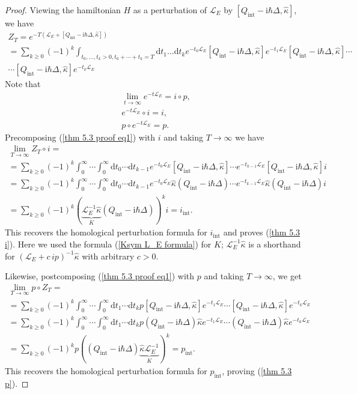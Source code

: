 \documentclass{amsart}
\theoremstyle{plain} %
\theoremstyle{definition}
\theoremstyle{remark}
\newcommand{\mc}{\mathcal}
\newcommand{\ra}{\rightarrow}
\newcommand{\wh}{\widehat}
\newcommand{\LL}{\mathcal{L}}
\newcommand{\ii}{\mathrm{int}}
\newcommand{\iii}{\mathrm{i}}
\newcommand{\dr}{\mathrm{d}}
\begin{document}
\begin{proof}
Viewing the hamiltonian $H$ as a perturbation of $\mc{L}_E$ by $[Q_\ii-\iii\hbar\Delta,\wh\kappa]$, 
we have
\begin{multline}\label{thm 5.3 proof eq1}
Z_T=e^{-T (\mc{L}_E+[Q_\ii-\iii\hbar\Delta,\wh\kappa])}
\\
=\sum_{k\geq 0}(-1)^k\int_{t_0,\ldots,t_k>0, t_0+\cdots+t_k=T}\dr t_1\ldots \dr t_k
e^{-t_0 \LL_E} [Q_\ii-\iii\hbar\Delta,\wh\kappa] e^{-t_1 \LL_E} [Q_\ii-\iii\hbar\Delta,\wh\kappa] \cdots \\
\cdots [Q_\ii-\iii\hbar\Delta,\wh\kappa] e^{-t_k \LL_E}
\end{multline}
Note that
\begin{eqnarray}
    \lim_{t\ra \infty} e^{-t \LL_E}= i\circ p, \label{thm 5.3 proof eq2}\\
    e^{-t \LL_E} \circ i = i, \label{thm 5.3 proof eq3}\\
    p\circ e^{-t \LL_E} = p. \label{thm 5.3 proof eq4}
\end{eqnarray}
Precomposing (\ref{thm 5.3 proof eq1}) with $i$ and taking $T\ra\infty$ we have
\begin{multline}
    \lim_{T\ra \infty}Z_T \circ i=\\=
    \sum_{k\geq 0}(-1)^k \int_0^\infty\cdots \int_0^\infty \dr t_0\cdots \dr t_{k-1}
    e^{-t_0 \LL_E} [Q_\ii-\iii\hbar\Delta,\wh\kappa] \cdots e^{-t_{k-1}\LL_E} [Q_\ii-\iii\hbar\Delta,\wh\kappa] i\\
    =\sum_{k\geq 0}(-1)^k \int_0^\infty\cdots \int_0^\infty \dr t_0\cdots \dr t_{k-1}
    e^{-t_0 \LL_E} \wh\kappa(Q_\ii-\iii\hbar\Delta) \cdots e^{-t_{k-1}\LL_E} \wh\kappa(Q_\ii-\iii\hbar\Delta) i\\
    =\sum_{k\geq 0} (-1)^k(\underbrace{\LL_E^{-1}\wh\kappa}_K (Q_\ii-\iii\hbar\Delta))^k i =
    i_\ii.
\end{multline}
This recovers the homological perturbation formula for $i_\ii$ and proves (\ref{thm 5.3 i}). Here we used the formula (\ref{Ksym L_E formula}) for $K$; $\LL_E^{-1}\wh\kappa$ is a shorthand for $(\LL_E+c\, ip)^{-1}\wh\kappa$ with arbitrary $c>0$.

Likewise, postcomposing (\ref{thm 5.3 proof eq1}) with $p$ and taking $T\ra\infty$, we get
\begin{multline}
    \lim_{T\ra\infty} p\circ Z_T =\\
    =\sum_{k\geq 0}(-1)^k \int_0^\infty \cdots \int_0^\infty \dr t_1\cdots \dr t_k
    p[Q_\ii-\iii\hbar\Delta,\wh\kappa] e^{-t_1 \LL_E}
    \cdots [Q_\ii-\iii\hbar\Delta,\wh\kappa] e^{-t_k\LL_E} \\
    =\sum_{k\geq 0}(-1)^k \int_0^\infty \cdots \int_0^\infty \dr t_1\cdots \dr t_k
    p(Q_\ii-\iii\hbar\Delta)\wh\kappa e^{-t_1 \LL_E}
    \cdots (Q_\ii-\iii\hbar\Delta)\wh\kappa e^{-t_k\LL_E}\\
    =\sum_{k\geq 0}(-1)^k p((Q_\ii-\iii\hbar\Delta)\underbrace{\wh\kappa \LL_E^{-1}}_K)^k = p_\ii.
\end{multline}
This recovers the homological perturbation formula for $p_\ii$, proving (\ref{thm 5.3 p}).


\end{proof}
\end{document}
